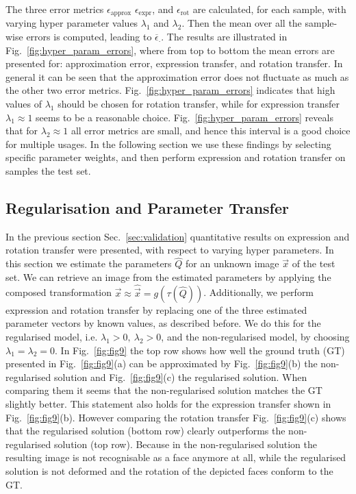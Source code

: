 The three error metrics $\epsilon_\text{approx}$ $\epsilon_\text{expr}$, and $\epsilon_\text{rot}$ are calculated, for each sample, with varying hyper parameter values $\lambda_1$ and $\lambda_2$. Then the mean over all the sample-wise errors is computed, leading to $\overline{\epsilon}_{\cdot}$. 
The results are illustrated in Fig.~\ref{fig:hyper_param_errors}, where from top to bottom the mean errors are presented for: approximation error, expression transfer, and rotation transfer. 
In general it can be seen that the approximation error does not fluctuate as much as the other two error metrics. 
Fig.~\ref{fig:hyper_param_errors} indicates that high values of $\lambda_1$ should be chosen for rotation transfer, while for expression transfer $\lambda_1\approx 1$ seems to be a reasonable choice. 
Fig.~\ref{fig:hyper_param_errors} reveals that for $\lambda_2 \approx 1$ all error metrics are small, and hence this interval is a good choice for multiple usages. 
In the following section we use these findings by selecting specific parameter weights, and then perform expression and rotation transfer on samples the test set. 

\subsection{Regularisation and Parameter Transfer}
\label{sec:approx}
In the previous section Sec.~\ref{sec:validation} quantitative results on expression and rotation transfer were presented, with respect to varying hyper parameters. 
In this section we estimate the parameters $\widehat{Q}$ for an unknown image $\vec{x}$ of the test set. We can retrieve an image from the estimated parameters by applying the composed transformation $\vec{x}\approx\widehat{\vec{x}}= g(\tau(\widehat{Q}))$. 
Additionally, we perform expression and rotation transfer by replacing one of the three estimated parameter vectors by known values, as described before. 
We do this for the regularised model, i.e. $\lambda_1>0,~\lambda_2>0$, and the non-regularised model, by choosing $\lambda_1=\lambda_2=0$. 
In Fig.~\ref{fig:fig9} the top row shows how well the ground truth (GT) presented in Fig.~\ref{fig:fig9}(a) can be approximated by Fig.~\ref{fig:fig9}(b) the non-regularised solution and Fig.~\ref{fig:fig9}(c) the regularised solution. When comparing them it seems that the non-regularised solution matches the GT slightly better. 
This statement also holds for the expression transfer shown in Fig.~\ref{fig:fig9}(b). 
However comparing the rotation transfer Fig.~\ref{fig:fig9}(c) shows that the regularised solution (bottom row) clearly outperforms the non-regularised solution (top row). Because in the non-regularised solution the resulting image is not recognisable as a face anymore at all, while the regularised solution is not deformed and the rotation of the depicted faces conform to the GT.



